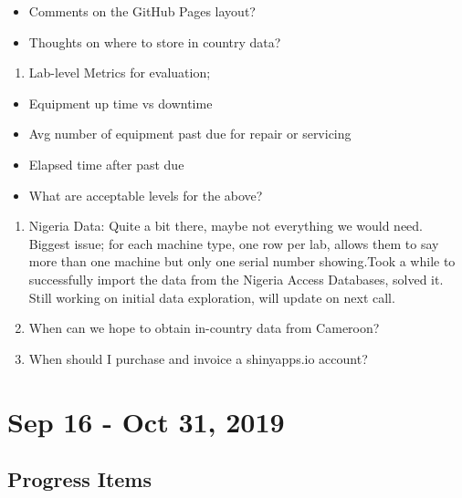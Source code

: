 \documentclass[]{article}
\providecommand{\tightlist}{%
  \setlength{\itemsep}{0pt}\setlength{\parskip}{0pt}}
\begin{document}
\begin{itemize}
\tightlist
\item
  Comments on the GitHub Pages layout?
\item
  Thoughts on where to store in country data?
\end{itemize}

\begin{enumerate}
\def\labelenumi{\arabic{enumi}.}
\setcounter{enumi}{1}
\tightlist
\item
  Lab-level Metrics for evaluation;
\end{enumerate}

\begin{itemize}
\tightlist
\item
  Equipment up time vs downtime
\item
  Avg number of equipment past due for repair or servicing
\item
  Elapsed time after past due
\item
  What are acceptable levels for the above?
\end{itemize}

\begin{enumerate}
\def\labelenumi{\arabic{enumi}.}
\setcounter{enumi}{2}
\tightlist
\item
  Nigeria Data: Quite a bit there, maybe not everything we would need.
  Biggest issue; for each machine type, one row per lab, allows them to
  say more than one machine but only one serial number showing.Took a
  while to successfully import the data from the Nigeria Access
  Databases, solved it. Still working on initial data exploration, will
  update on next call.
\item
  When can we hope to obtain in-country data from Cameroon?
\item
  When should I purchase and invoice a shinyapps.io account?
\end{enumerate}

\hypertarget{sep-16---oct-31-2019}{%
\section{Sep 16 - Oct 31, 2019}\label{sep-16---oct-31-2019}}

\hypertarget{progress-items-15}{%
\subsection{Progress Items}\label{progress-items-15}}
\end{document}
